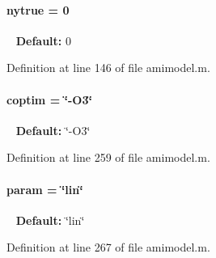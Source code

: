 \hypertarget{classamimodel_ac91d7b36031ec122abc9f739692b02e8}{}
\paragraph[{nytrue}]{\setlength{\rightskip}{0pt plus 5cm}nytrue = 0}\label{classamimodel_ac91d7b36031ec122abc9f739692b02e8}
~\newline
{\bfseries Default\+:} 0 

Definition at line 146 of file amimodel.\+m.

\hypertarget{classamimodel_ad99abcd270ac97546c46292ebc6c2e0a}{}
\paragraph[{coptim}]{\setlength{\rightskip}{0pt plus 5cm}coptim = \char`\"{}-\/O3\char`\"{}}\label{classamimodel_ad99abcd270ac97546c46292ebc6c2e0a}
~\newline
{\bfseries Default\+:} \char`\"{}-\/\+O3\char`\"{} 

Definition at line 259 of file amimodel.\+m.

\hypertarget{classamimodel_a51f20d6b1b54a2eee3be0e8adc96a0ae}{}
\paragraph[{param}]{\setlength{\rightskip}{0pt plus 5cm}param = \char`\"{}lin\char`\"{}}\label{classamimodel_a51f20d6b1b54a2eee3be0e8adc96a0ae}
~\newline
{\bfseries Default\+:} \char`\"{}lin\char`\"{} 

Definition at line 267 of file amimodel.\+m.

